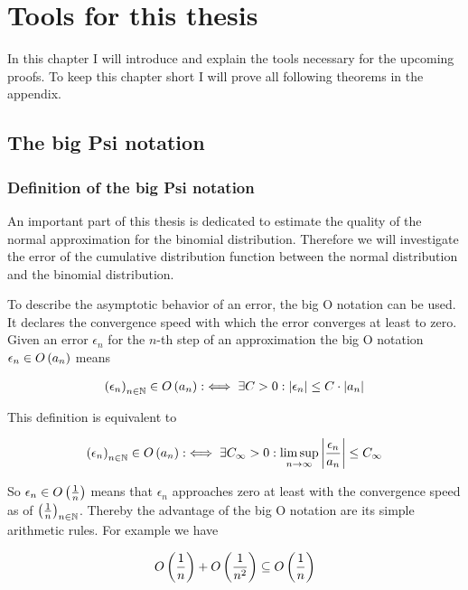 \chapter{Tools for this thesis}

In this chapter I will introduce and explain the tools necessary for the upcoming proofs. To keep this chapter short I will prove all following theorems in the appendix.

\section{The big Psi notation}

\subsection{Definition of the big Psi notation}
An important part of this thesis is dedicated to estimate the quality of the normal approximation for the binomial distribution. Therefore we will investigate the error of the cumulative distribution function between the normal distribution and the binomial distribution.

To describe the asymptotic behavior of an error, the big O notation can be used. It declares the convergence speed with which the error converges at least to zero. Given an error $\epsilon_n$ for the $n$-th step of an approximation the big O notation $\epsilon_n \in O\left( {a_n} \right)$ means 

\begin{align} \label{bigo_def1}
  \left({\epsilon_n}\right)_{{n}\in\mathbb N} \in O\left( {a_n} \right) :\iff \exists C > 0: \left|{\epsilon_n}\right| \le C \cdot \left|{a_n}\right|
\end{align}

\noindent This definition is equivalent to 

\begin{align} \label{bigo_def_limsup}
  \left({\epsilon_n}\right)_{{n}\in\mathbb N} \in O\left( {a_n} \right) :\iff \exists C_\infty > 0: \limsup_{n\to\infty} \left|{\frac{\epsilon_n}{a_n}}\right| \le C_\infty
\end{align}

So $\epsilon_n \in O\left( {\frac 1n} \right)$ means that $\epsilon_n$ approaches zero at least with the convergence speed as of $\left({\frac 1n}\right)_{{n}\in\mathbb N}$. Thereby the advantage of the big O notation are its simple arithmetic rules. For example we have

\begin{align}
  O\left( {\frac 1n} \right) + O\left( {\frac 1{n^2}} \right) \subseteq O\left( {\frac 1n} \right)
\end{align}

